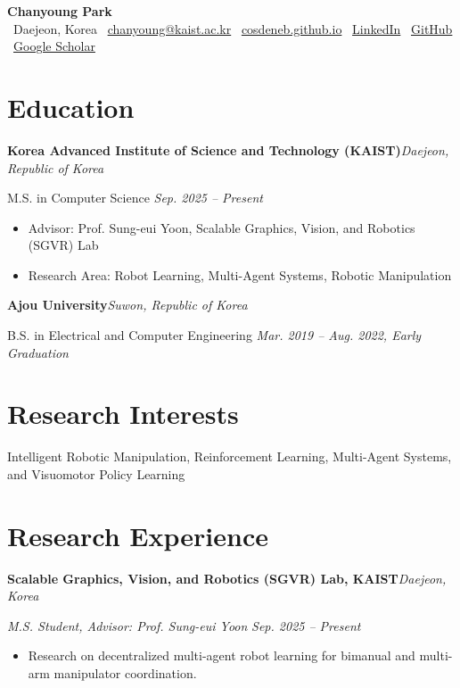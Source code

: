 \documentclass[10.5pt,a4paper]{article}
\newcommand{\heading}[2]{%
  \noindent\textbf{#1}\hfill{\itshape #2}\par
}
\begin{document}
\begin{center}
  {\Huge \bfseries Chanyoung Park}\\[6pt]
  {\small
    \faMapMarker\ Daejeon, Korea \quad
    \faEnvelope\ \href{mailto:chanyoung@kaist.ac.kr}{chanyoung@kaist.ac.kr} \quad
    \faGlobe\ \href{https://cosdeneb.github.io}{cosdeneb.github.io} \quad
    \faLinkedin\ \href{https://www.linkedin.com/in/chanyoung-park-799b672ab/}{LinkedIn} \quad
    \faGithub\ \href{https://github.com/cosdeneb}{GitHub} \quad
    \faGraduationCap\ \href{https://scholar.google.com/citations?hl=ko&user=fGD7V2IAAAAJ}{Google Scholar}
  }
\end{center}

\section*{Education}
\heading{Korea Advanced Institute of Science and Technology (KAIST)}{Daejeon, Republic of Korea}
M.S. in Computer Science \hfill \textit{Sep. 2025 -- Present}
\begin{itemize}
  \item Advisor: Prof. Sung-eui Yoon, Scalable Graphics, Vision, and Robotics (SGVR) Lab
  \item Research Area: Robot Learning, Multi-Agent Systems, Robotic Manipulation
\end{itemize}

\heading{Ajou University}{Suwon, Republic of Korea}
B.S. in Electrical and Computer Engineering \hfill \textit{Mar. 2019 -- Aug. 2022, Early Graduation}

\section*{Research Interests}
Intelligent Robotic Manipulation, Reinforcement Learning, Multi-Agent Systems, and Visuomotor Policy Learning

\section*{Research Experience}
\heading{Scalable Graphics, Vision, and Robotics (SGVR) Lab, KAIST}{Daejeon, Korea}
\textit{M.S. Student, Advisor: Prof. Sung-eui Yoon} \hfill \textit{Sep. 2025 -- Present}
\begin{itemize}
  \item Research on decentralized multi-agent robot learning for bimanual and multi-arm manipulator coordination.
\end{itemize}
\end{document}
